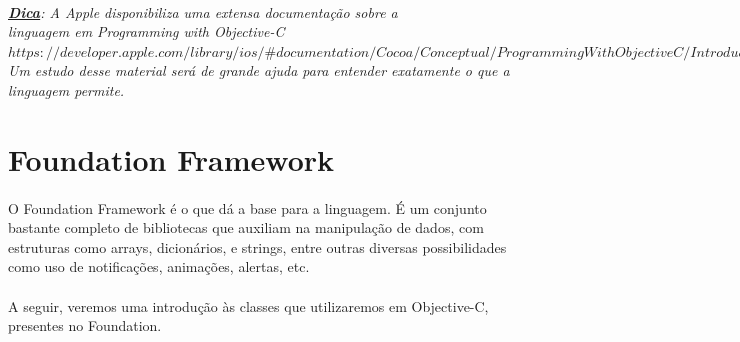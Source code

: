 \documentclass[a4paper,12pt,brazil,doubleside]{book}
\begin{document}
\bigskip

\paragraph{}\textit{\textbf{\underline{Dica}}: A Apple disponibiliza uma extensa documentação sobre a\\linguagem em Programming with Objective-C\\ \(https://developer.apple.com/library/ios/\#documentation/Cocoa/Conceptual/ProgrammingWithObjectiveC/Introduction/Introduction.html \)\\
Um estudo desse material será de grande ajuda para entender exatamente o que a linguagem permite.}

\bigskip
\bigskip


\section{Foundation Framework}

\paragraph{}O Foundation Framework é o que dá a base para a linguagem. É um conjunto bastante completo de bibliotecas que auxiliam na manipulação de dados, com estruturas como arrays, dicionários, e strings, entre outras diversas possibilidades como uso de notificações, animações, alertas, etc.
\paragraph{}A seguir, veremos uma introdução às classes que utilizaremos em Objective-C, presentes no Foundation.

\bigskip
\end{document}
